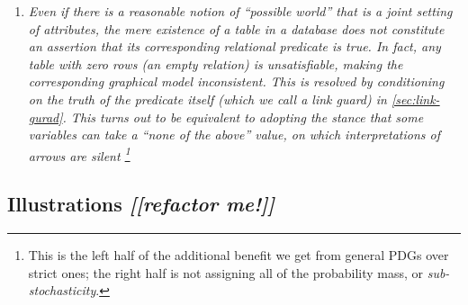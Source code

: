 \documentclass{article}
\theoremstyle{plain}
\theoremstyle{definition}
\theoremstyle{remark}
\begin{document}
\begin{enumerate}[resume]
	\item \itshape Even if there is a reasonable notion of ``possible world'' that is a joint setting of attributes, the mere existence of a table in a database does not constitute an assertion that its corresponding relational predicate is true. In fact, any table with zero rows (an empty relation) is unsatisfiable, making the corresponding graphical model inconsistent. This is resolved by conditioning on the truth of the predicate itself (which we call a \emph{link guard}) in \cref{sec:link-gurad}. This turns out to be equivalent to adopting the stance that some variables can take a ``none of the above'' value, on which interpretations of arrows are silent%
	\footnote{This is the left half of the additional benefit we get from general PDGs over strict ones; the right half is not assigning all of the probability mass, or \emph{sub-stochasticity}. }
\end{enumerate}



\subsection{Illustrations \emph{[[refactor me!]]}}
\end{document}

